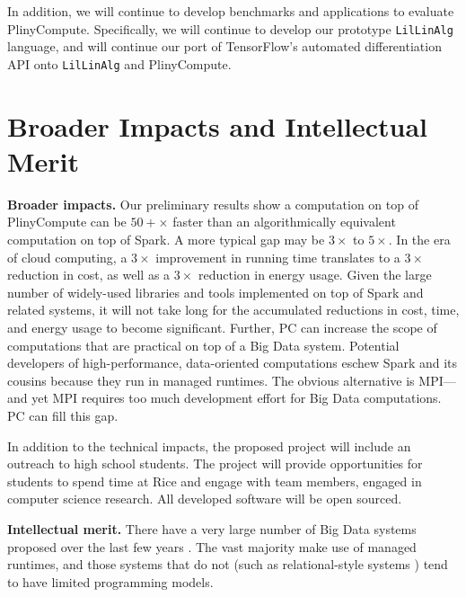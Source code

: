 \vspace{-7 pt}
In addition, we will continue to develop benchmarks and applications
to evaluate PlinyCompute.  Specifically, we
will continue to develop our prototype \texttt{LilLinAlg} language, and will continue our port of
TensorFlow's automated differentiation API \cite{abadi2016tensorflow} onto \texttt{LilLinAlg} and PlinyCompute.

\section{Broader Impacts and Intellectual Merit}

\vspace{5pt}
\noindent
\textbf{Broader impacts.}
Our preliminary results show 
a computation on top of 
PlinyCompute can be $50+\times$ faster than an algorithmically equivalent computation on top of Spark.
A more typical gap may be $3\times$ to $5\times$.
In the era of cloud computing, a $3\times$ improvement in running time
translates to a $3\times$ reduction in 
cost, as well as a $3\times$ reduction in energy usage.
Given the
large number of widely-used libraries and tools implemented on top of Spark and related systems, 
it will not take long for the 
accumulated reductions in cost, time, and
energy usage to become significant.
Further, PC can increase the scope of computations that are practical
on top of a Big Data system.
Potential developers of high-performance, data-oriented
computations  eschew Spark and its cousins because they run in managed
runtimes.  The obvious alternative is MPI---and yet MPI requires too much development effort for Big
Data computations.  PC can fill this gap.

In addition to the technical impacts, the proposed project will include an outreach to high school 
students.  The project will provide opportunities for students to spend time at Rice and engage with
team members, engaged in computer science research.
All developed software will be open sourced.  

\vspace{5pt}
\noindent
\textbf{Intellectual merit.}
There have a very large number of Big Data 
systems proposed over the last few years \cite{white2009hadoop, palkar2017weld, zaharia2010spark, crotty2015tupleware, yu2008dryadlinq, alexandrov2014stratosphere, low2014graphlab, murray2013naiad, borkar2011hyracks}. The
vast majority make use of managed runtimes, and those systems that do not (such as relational-style systems \cite{bittorf2015impala}) tend
to have limited programming models.  


